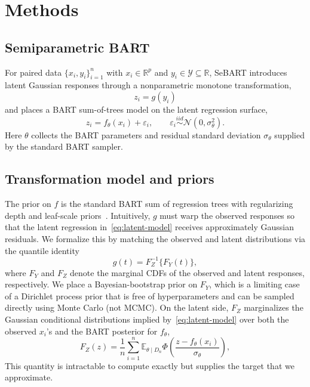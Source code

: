 \documentclass[10pt]{article}
\begin{document}
\section{Methods}
\subsection{Semiparametric BART}
For paired data $\{x_i,y_i\}^{n}_{i=1}$ with $x_i \in \mathbb R^p$ and $y_i \in \mathcal Y \subseteq \mathbb{R}$, SeBART introduces latent Gaussian responses through a nonparametric monotone transformation,
\begin{equation}\label{eq:latent-transform}
z_i = g(y_i)
\end{equation}
and places a BART sum-of-trees model on the latent regression surface,
\begin{equation}\label{eq:latent-model}
z_i = f_\theta(x_i) + \varepsilon_i, \qquad \varepsilon_i \stackrel{iid}{\sim} \mathcal N(0,\sigma_\theta^2).
\end{equation}
Here $\theta$ collects the BART parameters and residual standard deviation $\sigma_\theta$ supplied by the standard BART sampler.

\subsection{Transformation model and priors}
The prior on $f$ is the standard BART sum of regression trees with regularizing depth and leaf-scale priors~\cite{Chipman_2010}. Intuitively, $g$ must warp the observed responses so that the latent regression in~\eqref{eq:latent-model} receives approximately Gaussian residuals. We formalize this by matching the observed and latent distributions via the quantile identity
\begin{equation}\label{eq:quantile-match}
g(t) = F_Z^{-1}\{F_Y(t)\},
\end{equation}
where $F_Y$ and $F_Z$ denote the marginal CDFs of the observed and latent responses, respectively. We place a Bayesian-bootstrap prior on $F_Y$, which is a limiting case of a Dirichlet process prior that is free of hyperparameters and can be sampled directly using Monte Carlo (not MCMC). On the latent side, $F_Z$ marginalizes the Gaussian conditional distributions implied by~\eqref{eq:latent-model} over both the observed $x_i$'s and the BART posterior for $f_\theta$,
\begin{equation}\label{eq:Fz-definition}
F_Z(z) = \frac{1}{n}\sum_{i=1}^n \mathbb E_{\theta\mid D_n} \Phi\!\left(\frac{z - f_\theta(x_i)}{\sigma_\theta}\right),
\end{equation}
This quantity is intractable to compute exactly but supplies the target that we approximate.
\end{document}
